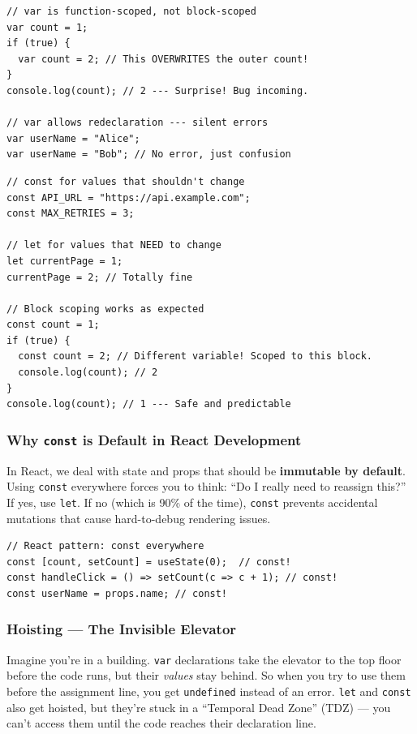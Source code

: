 \documentclass[12pt]{article}
\begin{document}
\begin{badway}
\begin{lstlisting}
// var is function-scoped, not block-scoped
var count = 1;
if (true) {
  var count = 2; // This OVERWRITES the outer count!
}
console.log(count); // 2 --- Surprise! Bug incoming.

// var allows redeclaration --- silent errors
var userName = "Alice";
var userName = "Bob"; // No error, just confusion
\end{lstlisting}
\end{badway}

\begin{proway}
\begin{lstlisting}
// const for values that shouldn't change
const API_URL = "https://api.example.com";
const MAX_RETRIES = 3;

// let for values that NEED to change
let currentPage = 1;
currentPage = 2; // Totally fine

// Block scoping works as expected
const count = 1;
if (true) {
  const count = 2; // Different variable! Scoped to this block.
  console.log(count); // 2
}
console.log(count); // 1 --- Safe and predictable
\end{lstlisting}
\end{proway}

\subsubsection*{Why \texttt{const} is Default in React Development}

In React, we deal with state and props that should be \textbf{immutable by default}. Using \texttt{const} everywhere forces you to think: ``Do I really need to reassign this?'' If yes, use \texttt{let}. If no (which is 90\% of the time), \texttt{const} prevents accidental mutations that cause hard-to-debug rendering issues.

\begin{lstlisting}
// React pattern: const everywhere
const [count, setCount] = useState(0);  // const!
const handleClick = () => setCount(c => c + 1); // const!
const userName = props.name; // const!
\end{lstlisting}

\subsubsection*{Hoisting --- The Invisible Elevator}

\begin{analogybox}
Imagine you're in a building. \texttt{var} declarations take the elevator to the top floor before the code runs, but their \textit{values} stay behind. So when you try to use them before the assignment line, you get \texttt{undefined} instead of an error. \texttt{let} and \texttt{const} also get hoisted, but they're stuck in a ``Temporal Dead Zone'' (TDZ) --- you can't access them until the code reaches their declaration line.
\end{analogybox}
\end{document}
